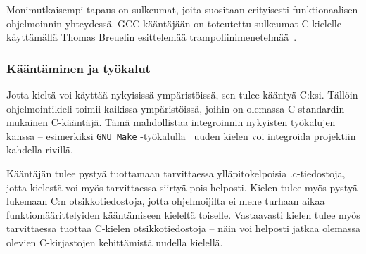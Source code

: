 Monimutkaisempi tapaus on sulkeumat, joita suositaan erityisesti
funktionaalisen ohjelmoinnin yhteydessä. GCC-kääntäjään on toteutettu sulkeumat
C-kielelle käyttämällä Thomas Breuelin esittelemää
trampoliinimenetelmää~\citep{gccnested, cppclosure}.

%

\subsubsection{Kääntäminen ja työkalut}

Jotta kieltä voi käyttää nykyisissä ympäristöissä, sen tulee kääntyä C:ksi.
Tällöin ohjelmointikieli toimii kaikissa ympäristöissä, joihin on olemassa
C-standardin mukainen C-kääntäjä. Tämä mahdollistaa integroinnin nykyisten
työkalujen kanssa -- esimerkiksi \texttt{GNU Make} -työkalulla~\citep{gnumake}
uuden kielen voi integroida projektiin kahdella rivillä.


Kääntäjän tulee pystyä tuottamaan tarvittaessa ylläpitokelpoisia .c-tiedostoja,
jotta kielestä voi myös tarvittaessa siirtyä pois helposti.  Kielen tulee myös
pystyä lukemaan C:n otsikkotiedostoja, jotta ohjelmoijilta ei mene turhaan
aikaa funktiomäärittelyiden kääntämiseen kieleltä toiselle. Vastaavasti kielen
tulee myös tarvittaessa tuottaa C-kielen otsikkotiedostoja -- näin voi helposti
jatkaa olemassa olevien C-kirjastojen kehittämistä uudella kielellä.

